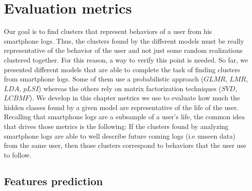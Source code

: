 
\chapter{Evaluation metrics} %

\label{Chapter5} %

Our goal is to find clusters that represent behaviors of a user from his smartphone logs. Thus, the clusters found by the different models must be really representative of the behavior of the user and not just some random realizations clustered together. For this reason, a way to verify this point is needed. So far, we presented different models that are able to complete the task of finding clusters from smartphone logs. Some of them use a probabilistic approach ($GLMR$, $LMR$, $LDA$, $pLSI$) whereas the others rely on matrix factorization techniques ($SVD$, $LCBMF$). We develop in this chapter metrics we use to evaluate how much the hidden classes found by a given model are representative of the life of the user. Recalling that smartphone logs are a subsample of a user's life, the common idea that drives those metrics is the following: If the clusters found by analyzing smartphone logs are able to well describe future coming logs (i.e unseen data) from the same user, then those clusters correspond to behaviors that the user use to follow.

\section{Features prediction}

